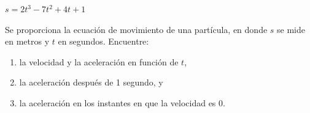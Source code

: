 \item $s = 2t^3 - 7t^2 + 4t + 1$
\par
Se proporciona la ecuación de movimiento de una partícula, en donde $s$ se mide en metros y $t$ en segundos. Encuentre:
\begin{enumerate}
    \item[(a)] la velocidad y la aceleración en función de $t$,
    \item[(b)] la aceleración después de 1 segundo, y
    \item[(c)] la aceleración en los instantes en que la velocidad es 0.
\end{enumerate}
